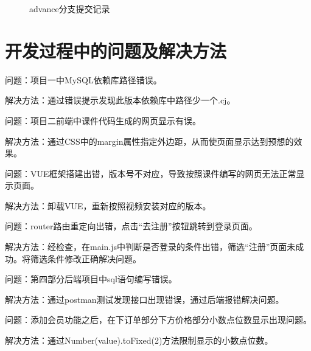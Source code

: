 \begin{figure}[H]
    \centering
    \centering
    \caption{advance分支提交记录}
\end{figure}


\section{开发过程中的问题及解决方法}
问题：项目一中MySQL依赖库路径错误。

解决方法：通过错误提示发现此版本依赖库中路径少一个.cj。
\\
\par
问题：项目二前端中课件代码生成的网页显示有误。

解决方法：通过CSS中的margin属性指定外边距，从而使页面显示达到预想的效果。
\\
\par
问题：VUE框架搭建出错，版本号不对应，导致按照课件编写的网页无法正常显示页面。

解决方法：卸载VUE，重新按照视频安装对应的版本。
\\
\par
问题：router路由重定向出错，点击“去注册”按钮跳转到登录页面。

解决方法：经检查，在main.js中判断是否登录的条件出错，筛选“注册”页面未成功。将筛选条件修改正确解决问题。
\\
\par
问题：第四部分后端项目中sql语句编写错误。

解决方法：通过postman测试发现接口出现错误，通过后端报错解决问题。
\\
\par
问题：添加会员功能之后，在下订单部分下方价格部分小数点位数显示出现问题。

解决方法：通过Number(value).toFixed(2)方法限制显示的小数点位数。







